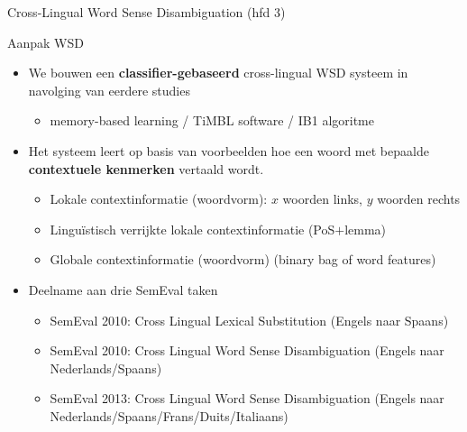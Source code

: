 \documentclass[8pt]{beamer}
\begin{document}
\begin{frame}{Cross-Lingual Word Sense Disambiguation (hfd 3)}


	\begin{block}{Aanpak WSD}
        \begin{itemize}
            \item We bouwen een \textbf{classifier-gebaseerd} cross-lingual WSD systeem in navolging van eerdere studies \citep{Hoste+02,Hendrickx+02}
            \begin{itemize}
                \item \color{teal} memory-based learning / TiMBL software / IB1 algoritme
            \end{itemize}
            \item Het systeem leert op basis van voorbeelden hoe een woord met bepaalde \textbf{contextuele kenmerken}
                vertaald wordt.
            \begin{itemize}
                \item \color{teal} Lokale contextinformatie (woordvorm): $x$ woorden links, $y$ woorden rechts
                \item Linguïstisch verrijkte lokale contextinformatie (PoS$+$lemma)
                \item Globale contextinformatie (woordvorm) \footnotesize{(binary bag of word features)}
            \end{itemize}
            \item Deelname aan drie SemEval taken
            \begin{itemize}
                \item SemEval 2010: Cross Lingual Lexical Substitution {\footnotesize(Engels naar Spaans)} \citep{CLLS}
                \item SemEval 2010: Cross Lingual Word Sense Disambiguation {\footnotesize(Engels naar Nederlands/Spaans)} \citep{WSD}
                \item SemEval 2013: Cross Lingual Word Sense Disambiguation {\footnotesize(Engels naar
                    Nederlands/Spaans/Frans/Duits/Italiaans)} \citep{CLWSD2013TASKPAPER}
            \end{itemize}
        \end{itemize}
	\end{block}

\end{frame}
\end{document}
